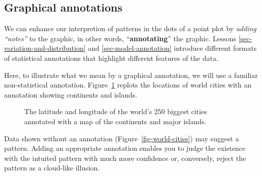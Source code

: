 \documentclass[
  letterpaper,
  DIV=11,
  numbers=noendperiod,
  oneside]{scrartcl}
\begin{document}
\subsection{Graphical annotations}\label{graphical-annotations}

We can enhance our interpretion of patterns in the dots of a point plot
by \emph{adding ``notes''} to the graphic, in other words,
``\textbf{annotating}'' the graphic. Lessons
\ref{sec-variation-and-distribution} and \ref{sec-model-annotation}
introduce different formats of statistical annotations that highlight
different features of the data.

Here, to illustrate what we mean by a graphical annotation, we will use
a familiar non-statistical annotation.
Figure~\ref{fig-cities-with-continents} replots the locations of world
cities with an annotation showing continents and islands.

\begin{figure}


\caption{\label{fig-cities-with-continents}The latitude and longitude of
the world's 250 biggest cities annotated with a map of the continents
and major islands.}

\end{figure}%

Data shown without an annotation (Figure~\ref{fig-world-cities}) may
suggest a pattern. Adding an appropriate annotation enables you to judge
the existence with the intuited pattern with much more confidence or,
conversely, reject the pattern as a cloud-like illusion.
\end{document}
